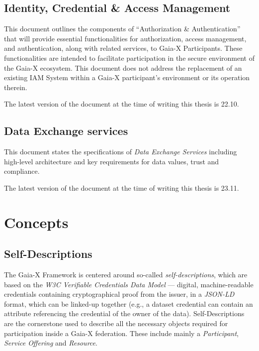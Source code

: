 \subsection{Identity, Credential \& Access Management}\label{subsec:identity-credential-&-access-management}

This document outlines the components of ``Authorization \& Authentication'' that will provide essential functionalities for authorization, access management, and authentication, along with related services, to Gaia-X Participants\cite{gaiax_identity_and_access_management}.
These functionalities are intended to facilitate participation in the secure environment of the Gaia-X ecosystem.
This document does not address the replacement of an existing IAM System within a Gaia-X participant's environment or its operation therein.

The latest version of the document at the time of writing this thesis is 22.10.

\subsection{Data Exchange services}\label{subsec:data-exchange-services}

This document states the specifications of \textit{Data Exchange Services} including high-level architecture and key requirements for data values, trust and compliance\cite{gaiax_data_exchange_document}.

The latest version of the document at the time of writing this thesis is 23.11.

\section{Concepts}\label{sec:concepts}


\subsection{Self-Descriptions}\label{subsec:self-descriptions}
The Gaia-X Framework is centered around so-called \textit{self-descriptions}, which are based on the \textit{W3C Verifiable Credentials Data Model} --- digital, machine-readable credentials containing cryptographical proof from the issuer, in a \textit{JSON-LD} format, which can be linked-up together (e.g., a dataset credential can contain an attribute referencing the credential of the owner of the data).
Self-Descriptions are the cornerstone used to describe all the necessary objects required for participation inside a Gaia-X federation.
These include mainly a \textit{Participant}, \textit{Service Offering} and \textit{Resource}.

